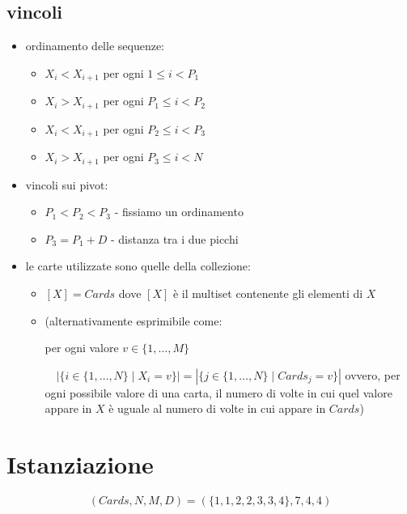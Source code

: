 \documentclass[12pt]{article}
\begin{document}
    \subsection*{vincoli}
        \begin{itemize}
                \item ordinamento delle sequenze:
            \begin{itemize}
            \item $X_i < X_{i+1}$ per ogni $1 \leq i < P_1$
            \item $X_i > X_{i+1}$ per ogni $P_1 \leq i < P_2$ 
            \item $X_i < X_{i+1}$ per ogni $P_2 \leq i < P_3$
            \item $X_i > X_{i+1}$ per ogni $P_3 \leq i < N$
            \end{itemize}
                \item vincoli sui pivot:
            \begin{itemize}
            \item $P_1 < P_2 < P_3$ - fissiamo un ordinamento
                
            \item $P_3 = P_1 + D$ - distanza tra i due picchi
            \end{itemize}

        \item le carte utilizzate sono quelle della collezione:
            \begin{itemize}
                \item $[X] = Cards$ 
                    \subitem dove $[X]$ è il multiset contenente gli elementi di $X$
                \item (alternativamente esprimibile come:

                    \subitem per ogni valore $v \in \{1, \dots, M\}$

                    $\quad |\{i \in \{1, \dots, N\} \mid X_i = v\}| = |\{j \in \{1, \dots, N\} \mid Cards_j = v\}|$
                    \subitem ovvero, per ogni possibile valore di una carta, il numero di volte in cui quel valore appare in $X$ è uguale al numero di volte in cui appare in $Cards$)
            \end{itemize}
        \end{itemize}

\section{Istanziazione}
$$(Cards, N, M, D) = (\{1, 1, 2, 2, 3, 3, 4\}, 7, 4, 4)$$
\end{document}
